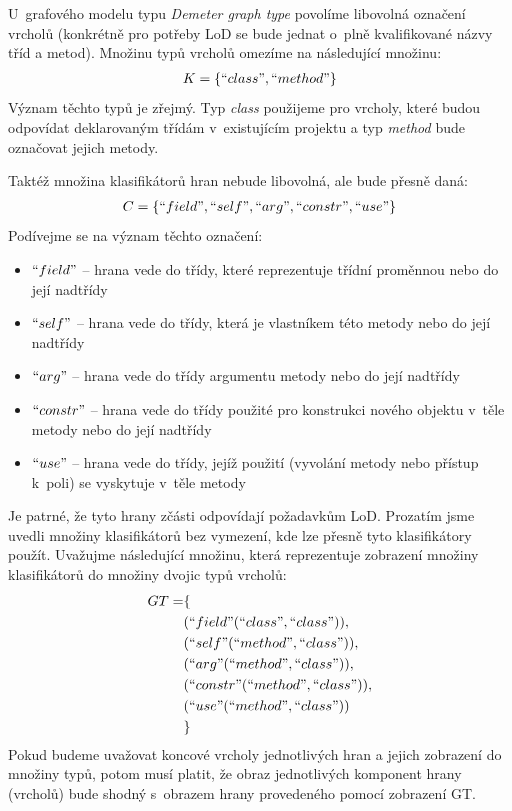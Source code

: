 U~grafového modelu typu \emph{Demeter graph type} povolíme libovolná označení vrcholů (konkrétně pro potřeby LoD se bude jednat o~plně kvalifikované názvy tříd a metod). Množinu typů vrcholů omezíme na následující množinu:
\begin{align*}
K = \{ ``class", ``method" \}
\end{align*}
Význam těchto typů je zřejmý. Typ \emph{class} použijeme pro vrcholy, které budou odpovídat deklarovaným třídám v~existujícím projektu a typ \emph{method} bude označovat jejich metody.

Taktéž množina klasifikátorů hran nebude libovolná, ale bude přesně daná:
\begin{align*}
C = \{ ``field", ``self", ``arg", ``constr", ``use" \}
\end{align*}
Podívejme se na význam těchto označení:
\begin{itemize}
\item $``field"$ -- hrana vede do třídy, které reprezentuje třídní proměnnou nebo do její nadtřídy
\item $``self"$ -- hrana vede do třídy, která je vlastníkem této metody nebo do její nadtřídy
\item $``arg"$ -- hrana vede do třídy argumentu metody nebo do její nadtřídy
\item $``constr"$ -- hrana vede do třídy použité pro konstrukci nového objektu v~těle metody nebo do její nadtřídy
\item $``use"$ -- hrana vede do třídy, jejíž použití (vyvolání metody nebo přístup k~poli) se vyskytuje v~těle metody
\end{itemize}
Je patrné, že tyto hrany zčásti odpovídají požadavkům LoD. Prozatím jsme uvedli množiny klasifikátorů bez vymezení, kde lze přesně tyto klasifikátory použít. Uvažujme následující množinu, která reprezentuje zobrazení množiny klasifikátorů do množiny dvojic typů vrcholů:
\begin{align*}
GT = &\{ \\
&(``field" (``class", ``class")), \\
&(``self" (``method", ``class")), \\
&(``arg" (``method", ``class")), \\
&(``constr" (``method", ``class")), \\
&(``use" (``method", ``class")) \\
&\}
\end{align*}
Pokud budeme uvažovat koncové vrcholy jednotlivých hran a jejich zobrazení do množiny typů, potom musí platit, že obraz jednotlivých komponent hrany (vrcholů) bude shodný s~obrazem hrany provedeného pomocí zobrazení GT.

